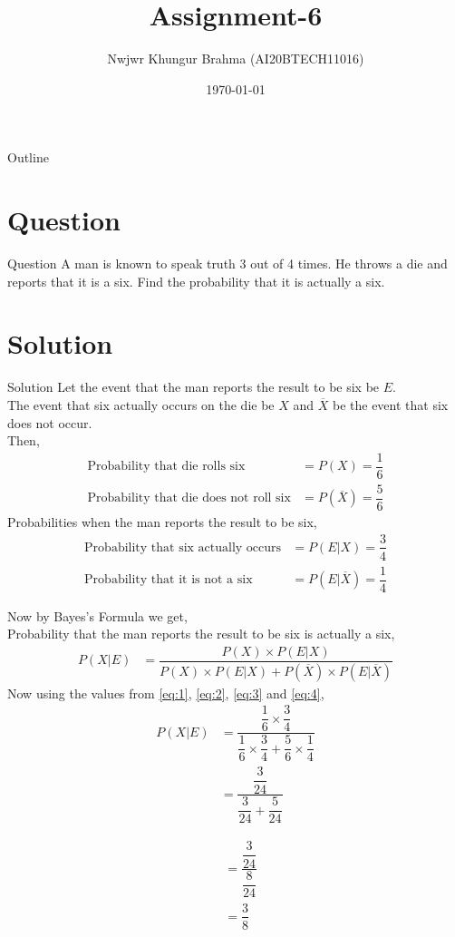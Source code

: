 \documentclass{beamer}
\title{Assignment-6}
\author{Nwjwr Khungur Brahma (AI20BTECH11016)}
\date{\today}
\begin{document}
\begin{frame}
    \titlepage 
\end{frame}


\begin{frame}{Outline}
    \tableofcontents
\end{frame}


\section{Question}
\begin{frame}{Question}
A man is known to speak truth 3 out of 4 times. He throws a die and reports that it is a six. Find the probability that it is actually a six.
\end{frame}

\section{Solution}
\begin{frame}{Solution}
Let the event that the man reports the result to be six be $E$.\\The event that six actually occurs on the die be $X$ and $\overline{X}$ be the event that six does not occur.\\
Then,
\begin{align}
\text{Probability that die rolls six}&=P(X)=\dfrac{1}{6}\label{eq:1}\\
\text{Probability that die does not roll six}&=P(\overline{X})=\dfrac{5}{6}\label{eq:2}
\end{align}
Probabilities when the man reports the result to be six,
\begin{align}
\text{Probability that six actually occurs}&=P(E|X)=\dfrac{3}{4}\label{eq:3}\\
\text{Probability that it is not a six}&=P(E|\overline{X})=\dfrac{1}{4}\label{eq:4}
\end{align}
\end{frame}


\begin{frame}
Now by Bayes's Formula we get,\\
Probability that the man reports the result to be six is actually a six,\\
\begin{align}
P(X|E)&=\dfrac{P(X)\times P(E|X)}{P(X)\times P(E|X)+P(\overline{X})\times P(E|\overline{X})}
\end{align}
Now using the values from \eqref{eq:1}, \eqref{eq:2}, \eqref{eq:3} and \eqref{eq:4},
\begin{align}
P(X|E)&=\dfrac{\dfrac{1}{6}\times \dfrac{3}{4}}{\dfrac{1}{6}\times \dfrac{3}{4}+\dfrac{5}{6}\times\dfrac{1}{4}}\\
&=\dfrac{\dfrac{3}{24}}{\dfrac{3}{24}+\dfrac{5}{24}}
\end{align}
\end{frame}


\begin{frame}
\begin{align}
&=\dfrac{\dfrac{3}{24}}{\dfrac{8}{24}}\\
&=\dfrac{3}{8}
\end{align}
\end{frame}
\end{document}
